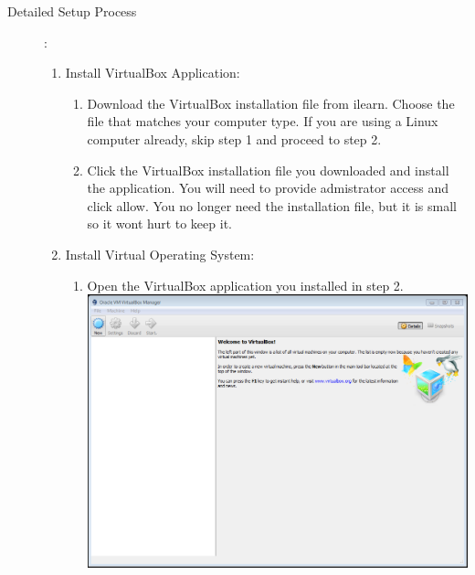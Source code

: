 \documentclass[12pt]{article}
\begin{document}
\begin{description}
  

\newpage

\item[Detailed Setup Process ]: \vspace{0mm} \\

	\begin{enumerate} 
	
	
	
	
\item Install VirtualBox Application: \\

\begin{enumerate} 
	
\item Download the VirtualBox installation file from ilearn. Choose the file that matches your computer type. If you are using a Linux computer already, skip step 1 and proceed to step 2. \vspace{5mm}

\item Click the VirtualBox installation file you downloaded and install the application. You will need to provide admistrator access and click allow. You no longer need the installation file, but it is small so it wont hurt to keep it. \vspace{5mm} \\

\end{enumerate}
  
\item Install Virtual Operating System: \vspace{0mm} \\
\begin{enumerate} 
    	\item Open the VirtualBox application you installed in step 2. \vspace{5mm} \\
      		\hspace*{-2.5cm}\includegraphics[scale=.6]{Capture1.png}\\
            \begin{itemize}
                

\end{itemize}
\end{enumerate}
\end{enumerate}
\end{description}
\end{document}

